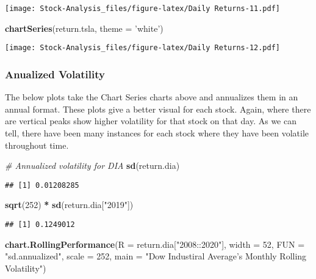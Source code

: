 \documentclass[
]{article}
\newenvironment{Shaded}{\begin{snugshade}}{\end{snugshade}}
\newcommand{\CommentTok}[1]{\textcolor[rgb]{0.56,0.35,0.01}{\textit{#1}}}
\newcommand{\DataTypeTok}[1]{\textcolor[rgb]{0.13,0.29,0.53}{#1}}
\newcommand{\DecValTok}[1]{\textcolor[rgb]{0.00,0.00,0.81}{#1}}
\newcommand{\KeywordTok}[1]{\textcolor[rgb]{0.13,0.29,0.53}{\textbf{#1}}}
\newcommand{\NormalTok}[1]{#1}
\newcommand{\OperatorTok}[1]{\textcolor[rgb]{0.81,0.36,0.00}{\textbf{#1}}}
\newcommand{\StringTok}[1]{\textcolor[rgb]{0.31,0.60,0.02}{#1}}
\begin{document}
\texttt{[image: Stock-Analysis\_files/figure-latex/Daily Returns-11.pdf]}

\begin{Shaded}
\begin{Highlighting}[]
\KeywordTok{chartSeries}\NormalTok{(return.tsla, }\DataTypeTok{theme =} \StringTok{'white'}\NormalTok{)}
\end{Highlighting}
\end{Shaded}

\texttt{[image: Stock-Analysis\_files/figure-latex/Daily Returns-12.pdf]}

\hypertarget{anualized-volatility}{%
\subsubsection{Anualized Volatility}\label{anualized-volatility}}

The below plots take the Chart Series charts above and annualizes them
in an annual format. These plots give a better visual for each stock.
Again, where there are vertical peaks show higher volatility for that
stock on that day. As we can tell, there have been many instances for
each stock where they have been volatile throughout time.

\begin{Shaded}
\begin{Highlighting}[]
\CommentTok{# Annualized volatility for DIA}
\KeywordTok{sd}\NormalTok{(return.dia)}
\end{Highlighting}
\end{Shaded}

\begin{verbatim}
## [1] 0.01208285
\end{verbatim}

\begin{Shaded}
\begin{Highlighting}[]
\KeywordTok{sqrt}\NormalTok{(}\DecValTok{252}\NormalTok{) }\OperatorTok{*}\StringTok{ }\KeywordTok{sd}\NormalTok{(return.dia[}\StringTok{"2019"}\NormalTok{])}
\end{Highlighting}
\end{Shaded}

\begin{verbatim}
## [1] 0.1249012
\end{verbatim}

\begin{Shaded}
\begin{Highlighting}[]
\KeywordTok{chart.RollingPerformance}\NormalTok{(}\DataTypeTok{R =}\NormalTok{ return.dia[}\StringTok{"2008::2020"}\NormalTok{],}
                         \DataTypeTok{width =} \DecValTok{52}\NormalTok{,}
                         \DataTypeTok{FUN =} \StringTok{"sd.annualized"}\NormalTok{,}
                         \DataTypeTok{scale =} \DecValTok{252}\NormalTok{,}
                         \DataTypeTok{main =} \StringTok{"Dow Industiral Average's Monthly Rolling Volatility"}\NormalTok{)}
\end{Highlighting}
\end{Shaded}
\end{document}
